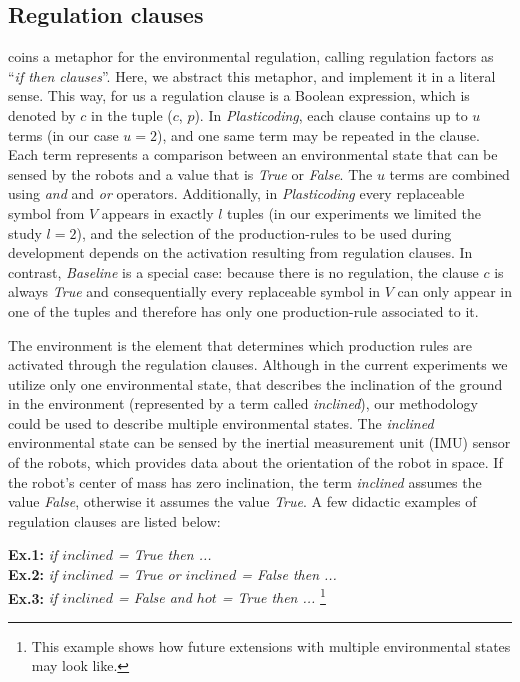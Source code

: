 \documentclass[utf8]{frontiersSCNS} %
\begin{document}
\subsection{Regulation clauses}
\label{sec:meth_regulation}

\citet{sapolsky2017behave} coins a metaphor for the environmental regulation, calling regulation factors as ``\textit{if then clauses}''. Here, we abstract this metaphor, and implement it in a literal sense. This way, for us a regulation clause is a Boolean expression, which is denoted by $c$ in the tuple ($c$, $p$). In \textit{Plasticoding}, each clause contains up to $u$ terms (in our case $u=2$), and one same term may be repeated in the clause. Each term represents a comparison between an environmental state that can be sensed by the robots and a value that is \textit{True} or \textit{False}. The $u$ terms are combined using \textit{and} and \textit{or} operators.  Additionally, in \textit{Plasticoding} every replaceable symbol from $V$ appears in exactly $l$ tuples (in our experiments we limited the study $l=2$), and the selection of the production-rules to be used during development depends on the activation resulting from regulation clauses. In contrast, \textit{Baseline} is a special case: because there is no regulation, the clause $c$ is always \textit{True} and consequentially every replaceable symbol in $V$ can only appear in one of the tuples and therefore has only one production-rule associated to it.

The environment is the element that determines which production rules are activated through the regulation clauses. Although  in the current experiments we utilize only one environmental state, that describes the inclination of the ground in the environment (represented by a term called \emph{inclined}), our methodology could be used to describe multiple environmental states.  The \emph{inclined} environmental state can be sensed by the inertial measurement unit (IMU) sensor of the robots, which provides data about the orientation of the robot in space. If the robot's center of mass has zero inclination, the term \emph{inclined} assumes the value \textit{False}, otherwise it assumes the value \textit{True}. A few didactic examples of regulation clauses are listed below:

\noindent \textbf{Ex.1:} \textit{if $inclined$ = True then ...} \\
\textbf{Ex.2:}  \textit{if $inclined$ = True or $inclined$ = False then ...} \\
\textbf{Ex.3:}  \textit{if $inclined$ = False and $hot$ = True then ... }\footnote{This example shows how future extensions with multiple environmental states may look like.}\\
\end{document}
